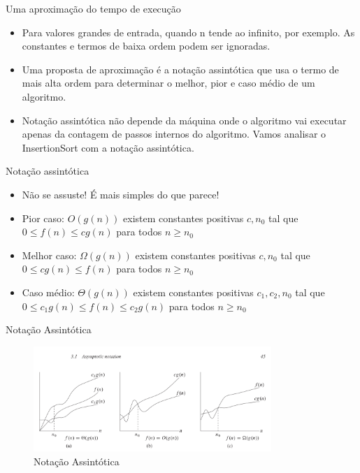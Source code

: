 \begin{frame}
\begin{block}{Uma aproximação do tempo de execução}
	\begin{itemize}
		\item Para valores grandes de entrada, quando n tende ao infinito, por exemplo. As constantes e termos de baixa ordem podem ser ignoradas.
		
		\item Uma proposta de aproximação é a notação assintótica que usa o termo de mais alta ordem para determinar o melhor, pior e caso médio de um algoritmo.
				
		\item Notação assintótica não depende da máquina onde o algoritmo vai executar apenas da contagem de passos internos do algoritmo.  Vamos analisar o InsertionSort com a notação assintótica.
		
	\end{itemize}
\end{block}
\end{frame}


\begin{frame}
\begin{block}{Notação assintótica}
	\begin{itemize}
		\item Não se assuste! É mais simples do que parece!

		\item Pior caso: $O(g(n))$ existem constantes positivas $c, n_0$ tal que $0 \leq f(n)  \leq cg(n)$ para todos $n \geq n_0$
				
		\item Melhor caso: $\Omega(g(n))$ existem constantes positivas $c, n_0$ tal que $0 \leq cg(n) \leq f(n)$ para todos $n \geq n_0$
				
		\item Caso médio: $\Theta(g(n))$ existem constantes positivas $c_1, c_2, n_0$ tal que $0 \leq c_1g(n) \leq f(n) \leq c_2g(n)$ para todos $n \geq n_0$
	\end{itemize}
\end{block}
\end{frame}

\begin{frame}	
	\begin{block}{Notação Assintótica}	
		 \begin{figure}[!htb]
			\centering	  				
			\includegraphics[height=4cm, width = 9cm]{./pic/analiseAssintotica.png}
			\caption{Notação Assintótica \cite{Cormen2009}}
			\label{fig_analise_assintotica}
		\end{figure}
	\end{block}
\end{frame}


